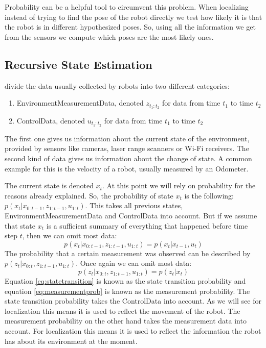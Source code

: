 Probability can be a helpful tool to circumvent this problem. When localizing instead of trying to find the pose of the robot directly we test how likely it is that the robot is in different hypothesized poses. So, using all the information we get from the sensors we compute which poses are the most likely ones\citep[p. 5]{Thrun:2005:PR:1121596}.
\subsection{Recursive State Estimation}
\citet{Thrun:2005:PR:1121596} divide the data usually collected by robots into two different categories:
\begin{enumerate}
	\setlength\itemsep{0 em}
	\item \Gls{EnvironmentMeasurementData}, denoted $z_{t_1:t_2}$ for data from time $t_1$ to time $t_2$
	\item \Gls{ControlData}, denoted $u_{t_1:t_2}$ for data from time $t_1$ to time $t_2$
\end{enumerate}
The first one gives us information about the current state of the environment, provided by sensors like cameras, laser range scanners or Wi-Fi receivers. The second kind of data gives us information about the change of state. A common example for this is the velocity of a robot, usually measured by an \gls{Odometer}\citep[p. 22-23]{Thrun:2005:PR:1121596}.

The current state is denoted $x_t$. At this point we will rely on probability for the reasons already explained. So, the probability of state $x_t$ is the following: $p(x_t|x_{0:t-1},z_{1:t-1}, u_{1:t})$. This takes all previous states, \gls{EnvironmentMeasurementData} and \gls{ControlData} into account. But if we assume that state $x_t$ is a sufficient summary of everything that happened before time step $t$, then we can omit most data: 
\begin{equation} \label{eq:statetransition}
p(x_t|x_{0:t-1},z_{1:t-1}, u_{1:t}) = p(x_t|x_{t-1}, u_t)
\end{equation}
The probability that a certain measurement was observed can be described by $p(z_t|x_{0:t},z_{1:t-1}, u_{1:t})$. Once again we can omit most data:
\begin{equation} \label{eq:measurementprob}
p(z_t|x_{0:t},z_{1:t-1}, u_{1:t}) = p(z_t|x_t)
\end{equation}
Equation \ref{eq:statetransition} is known as the state transition probability and equation \ref{eq:measurementprob} is known as the measurement probability. The state transition probability takes the \gls{ControlData} into account. As we will see for localization this means it is used to reflect the movement of the robot. The measurement probability on the other hand takes the measurement data into account. For localization this means it is used to reflect the information the robot has about its environment at the moment\citep[p. 24-25]{Thrun:2005:PR:1121596}.

